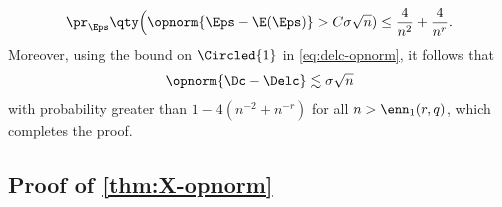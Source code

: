 \documentclass[10pt]{article}
\begin{document}
\begin{align}
    \pr_{\Eps}\qty\Big( \opnorm{\Eps - \E(\Eps)} > C\sigma\sqrt{n} ) \le \frac{4}{n^2} + \frac{4}{n^r}.
\end{align}
Moreover, using the bound on $\Circled{1}$ in \cref{eq:delc-opnorm}, it follows that
\begin{align}
    \opnorm{\Dc - \Delc} \lesssim \sigma \sqrt{n}\label{eq:opnorm-tail-bound-4}
\end{align}
with probability greater than $1 - 4(n^{-2} + n^{-r})$ for all $n > \enn_1(r, q)$, which completes the proof.
\QED






























\subsection{Proof of \cref{thm:X-opnorm}}
\label{proof:thm:X-opnorm}
\end{document}
